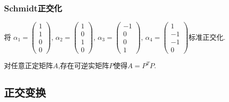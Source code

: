 \renewcommand{\mydate}{2025年06月03日\ 二十六次课}


\begin{frame}\frametitle{Schmidt正交化}
\begin{example}
将
$\alpha_1=\begin{pmatrix}1\\1\\0\\0\end{pmatrix}$,
$\alpha_2=\begin{pmatrix}1\\0\\1\\0\end{pmatrix}$,
$\alpha_3=\begin{pmatrix}-1\\0\\0\\1\end{pmatrix}$,
$\alpha_4=\begin{pmatrix}1\\-1\\-1\\0\end{pmatrix}$标准正交化.
\end{example}
\pp
\begin{corollary}
对任意正定矩阵$A$,存在可逆实矩阵$P$使得$A=P^TP$.
\end{corollary}
\end{frame}



\subsection{正交变换}

